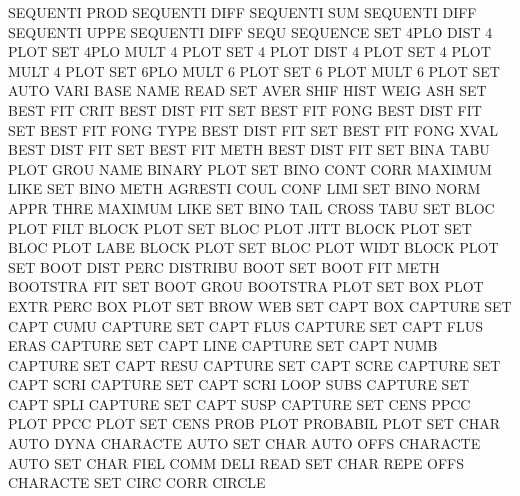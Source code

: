 SEQUENTI PROD                           SEQUENTI DIFF
SEQUENTI SUM                            SEQUENTI DIFF
SEQUENTI UPPE                           SEQUENTI DIFF
SEQU                                    SEQUENCE
SET      4PLO DIST                      4        PLOT
SET      4PLO MULT                      4        PLOT
SET      4    PLOT DIST                 4        PLOT
SET      4    PLOT MULT                 4        PLOT
SET      6PLO MULT                      6        PLOT
SET      6    PLOT MULT                 6        PLOT
SET      AUTO VARI BASE NAME            READ
SET      AVER SHIF HIST WEIG            ASH
SET      BEST FIT  CRIT                 BEST     DIST FIT
SET      BEST FIT  FONG                 BEST     DIST FIT
SET      BEST FIT  FONG TYPE            BEST     DIST FIT
SET      BEST FIT  FONG XVAL            BEST     DIST FIT
SET      BEST FIT  METH                 BEST     DIST FIT
SET      BINA TABU PLOT GROU NAME       BINARY   PLOT
SET      BINO CONT CORR                 MAXIMUM  LIKE
SET      BINO METH                      AGRESTI  COUL CONF LIMI
SET      BINO NORM APPR THRE            MAXIMUM  LIKE
SET      BINO TAIL                      CROSS    TABU
SET      BLOC PLOT FILT                 BLOCK    PLOT
SET      BLOC PLOT JITT                 BLOCK    PLOT
SET      BLOC PLOT LABE                 BLOCK    PLOT
SET      BLOC PLOT WIDT                 BLOCK    PLOT
SET      BOOT DIST PERC                 DISTRIBU BOOT
SET      BOOT FIT  METH                 BOOTSTRA FIT
SET      BOOT GROU                      BOOTSTRA PLOT
SET      BOX  PLOT EXTR PERC            BOX      PLOT
SET      BROW                           WEB
SET      CAPT BOX                       CAPTURE
SET      CAPT CUMU                      CAPTURE
SET      CAPT FLUS                      CAPTURE
SET      CAPT FLUS ERAS                 CAPTURE
SET      CAPT LINE                      CAPTURE
SET      CAPT NUMB                      CAPTURE
SET      CAPT RESU                      CAPTURE
SET      CAPT SCRE                      CAPTURE
SET      CAPT SCRI                      CAPTURE
SET      CAPT SCRI LOOP SUBS            CAPTURE
SET      CAPT SPLI                      CAPTURE
SET      CAPT SUSP                      CAPTURE
SET      CENS PPCC PLOT                 PPCC     PLOT
SET      CENS PROB PLOT                 PROBABIL PLOT
SET      CHAR AUTO DYNA                 CHARACTE AUTO
SET      CHAR AUTO OFFS                 CHARACTE AUTO
SET      CHAR FIEL COMM DELI            READ
SET      CHAR REPE OFFS                 CHARACTE
SET      CIRC CORR                      CIRCLE
